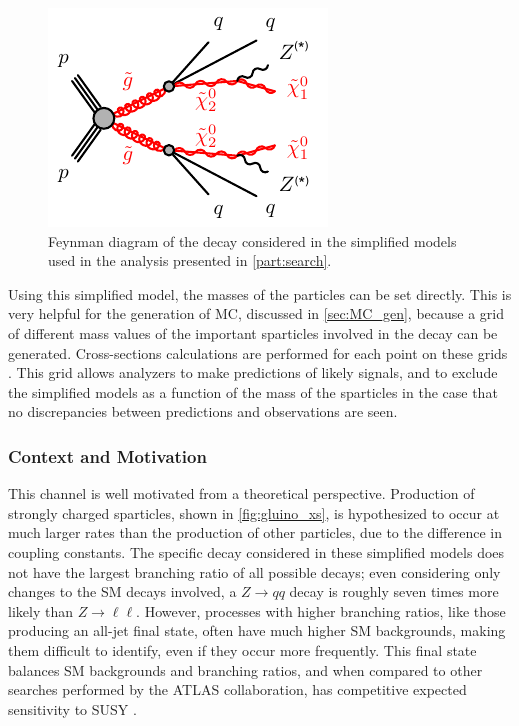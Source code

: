 \begin{centering}
\begin{figure}[!hbt]
\myfloatalign
\includegraphics[width=.9\linewidth]{figures/theory/gogo-qqqqZZN1N1.pdf}
\caption{Feynman diagram of the decay considered in the simplified models used in the analysis presented in \autoref{part:search}.}
\label{fig:simpmodel}
\end{figure}
\end{centering}

Using this simplified model, the masses of the particles can be set directly. This is very helpful for the generation of \acf{MC}, discussed in \autoref{sec:MC_gen}, because a grid of different mass values of the important sparticles involved in the decay can be generated. Cross-sections calculations are performed for each point on these grids \cite{1105.1110}. This grid allows analyzers to make predictions of likely signals, and to exclude the simplified models as a function of the mass of the sparticles in the case that no discrepancies between predictions and observations are seen. 


\subsubsection{Context and Motivation}

This channel is well motivated from a theoretical perspective. Production of strongly charged sparticles, shown in \autoref{fig:gluino_xs}, is hypothesized to occur at much larger rates than the production of other particles, due to the difference in coupling constants. The specific decay considered in these simplified models does not have the largest branching ratio of all possible decays; even considering only changes to the \ac{SM} decays involved, a $Z\rightarrow qq$ decay is roughly seven times more likely than $Z\rightarrow\ell\ell$. However, processes with higher branching ratios, like those producing an all-jet final state, often have much higher \ac{SM} backgrounds, making them difficult to identify, even if they occur more frequently. This final state balances \ac{SM} backgrounds and branching ratios, and when compared to other searches performed by the \ac{ATLAS} collaboration, has competitive expected sensitivity to \ac{SUSY} \cite{summary_plot}. 

